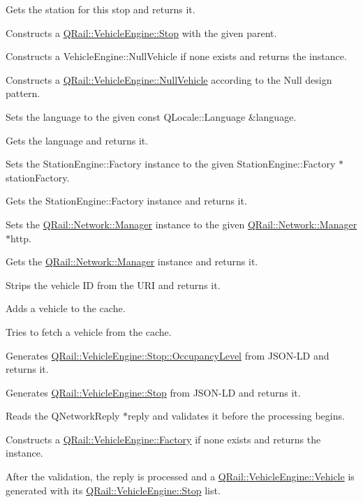 Gets the station for this stop and returns it.

Constructs a \mbox{\hyperlink{classQRail_1_1VehicleEngine_1_1Stop}{Q\+Rail\+::\+Vehicle\+Engine\+::\+Stop}} with the given parent.

Constructs a Vehicle\+Engine\+::\+Null\+Vehicle if none exists and returns the instance.

Constructs a \mbox{\hyperlink{classQRail_1_1VehicleEngine_1_1NullVehicle}{Q\+Rail\+::\+Vehicle\+Engine\+::\+Null\+Vehicle}} according to the Null design pattern.

Sets the language to the given const Q\+Locale\+::\+Language \&language.

Gets the language and returns it.

Sets the Station\+Engine\+::\+Factory instance to the given Station\+Engine\+::\+Factory $\ast$station\+Factory.

Gets the Station\+Engine\+::\+Factory instance and returns it.

Sets the \mbox{\hyperlink{classQRail_1_1Network_1_1Manager}{Q\+Rail\+::\+Network\+::\+Manager}} instance to the given \mbox{\hyperlink{classQRail_1_1Network_1_1Manager}{Q\+Rail\+::\+Network\+::\+Manager}} $\ast$http.

Gets the \mbox{\hyperlink{classQRail_1_1Network_1_1Manager}{Q\+Rail\+::\+Network\+::\+Manager}} instance and returns it.

Strips the vehicle ID from the U\+RI and returns it.

Adds a vehicle to the cache.

Tries to fetch a vehicle from the cache.

Generates \mbox{\hyperlink{classQRail_1_1VehicleEngine_1_1Stop_ad967ed81b19762bd582c1af07354a6d4}{Q\+Rail\+::\+Vehicle\+Engine\+::\+Stop\+::\+Occupancy\+Level}} from J\+S\+O\+N-\/\+LD and returns it.

Generates \mbox{\hyperlink{classQRail_1_1VehicleEngine_1_1Stop}{Q\+Rail\+::\+Vehicle\+Engine\+::\+Stop}} from J\+S\+O\+N-\/\+LD and returns it.

Reads the Q\+Network\+Reply $\ast$reply and validates it before the processing begins.

Constructs a \mbox{\hyperlink{classQRail_1_1VehicleEngine_1_1Factory}{Q\+Rail\+::\+Vehicle\+Engine\+::\+Factory}} if none exists and returns the instance.

After the validation, the reply is processed and a \mbox{\hyperlink{classQRail_1_1VehicleEngine_1_1Vehicle}{Q\+Rail\+::\+Vehicle\+Engine\+::\+Vehicle}} is generated with it\textquotesingle{}s \mbox{\hyperlink{classQRail_1_1VehicleEngine_1_1Stop}{Q\+Rail\+::\+Vehicle\+Engine\+::\+Stop}} list.

